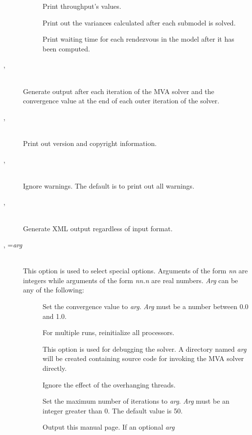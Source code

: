 \begin{description}
\begin{description}
\item[]
Print throughput's values.
\item[]
Print out the variances calculated after each submodel is solved.
\item[]
Print waiting time for each rendezvous in the model after it has been computed.
\end{description}
\item[\flag{v}{}, \longopt{verbose}]~\\
Generate output after each iteration of the MVA solver and the convergence value at the end of each outer iteration of the solver.
\item[\flag{V}{}, \longopt{version}]~\\
Print out version and copyright information.
\item[\flag{w}{}, \longopt{no-warnings}]~\\
Ignore warnings.  The default is to print out all warnings.
\item[\flag{x}{}, \longopt{xml}]~\\
Generate XML output regardless of input format.
\item[\flag{z}{}, \longopt{special}=\emph{arg}]~\\
This option is used to select special options.  Arguments of the form
\emph{nn} are integers while arguments of the form \emph{nn.n} are real
numbers.  \emph{Arg} can be any of the following:
\begin{description}
\item[]
Set the convergence value to \emph{arg}.  
\emph{Arg} must be a number between 0.0 and 1.0.
\item[]
For multiple runs, reinitialize all processors.
\item[]
This option is used for debugging the solver.  A directory named \emph{arg} will be created containing source code for invoking the MVA solver directly.
\item[]
Ignore the effect of the overhanging threads.
\item[]
Set the maximum number of iterations to \emph{arg}.
\emph{Arg} must be an integer greater than 0.  The default value is 50.
\item[]
Output this manual page.  If an optional \emph{arg}

\end{description}
\end{description}
